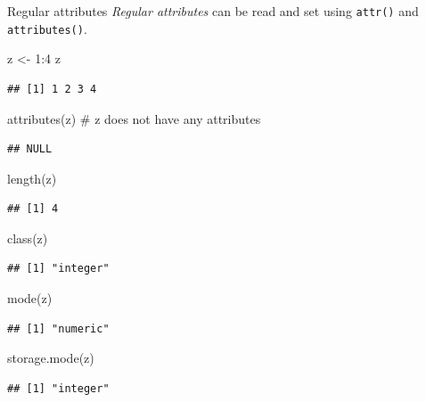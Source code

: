 \documentclass[
  9pt,
  ignorenonframetext,
]{beamer}
\newenvironment{Shaded}{\begin{snugshade}}{\end{snugshade}}
\newcommand{\CommentTok}[1]{\textcolor[rgb]{0.50,0.62,0.50}{#1}}
\newcommand{\DecValTok}[1]{\textcolor[rgb]{0.86,0.86,0.80}{#1}}
\newcommand{\KeywordTok}[1]{\textcolor[rgb]{0.94,0.87,0.69}{#1}}
\newcommand{\NormalTok}[1]{\textcolor[rgb]{0.80,0.80,0.80}{#1}}
\newcommand{\OperatorTok}[1]{\textcolor[rgb]{0.94,0.94,0.82}{#1}}
\newcommand{\StringTok}[1]{\textcolor[rgb]{0.80,0.58,0.58}{#1}}
\begin{document}
\begin{frame}[fragile]{Regular attributes}
\protect\hypertarget{regular-attributes}{}
\emph{Regular attributes} can be read and set using \texttt{attr()} and
\texttt{attributes()}.

\small
\vfill

\begin{Shaded}
\begin{Highlighting}[]
\NormalTok{z \textless{}{-}}\StringTok{ }\DecValTok{1}\OperatorTok{:}\DecValTok{4}
\NormalTok{z}
\end{Highlighting}
\end{Shaded}

\begin{verbatim}
## [1] 1 2 3 4
\end{verbatim}

\begin{Shaded}
\begin{Highlighting}[]
\KeywordTok{attributes}\NormalTok{(z)   }\CommentTok{\# z does not have any attributes}
\end{Highlighting}
\end{Shaded}

\begin{verbatim}
## NULL
\end{verbatim}

\begin{Shaded}
\begin{Highlighting}[]
\KeywordTok{length}\NormalTok{(z)}
\end{Highlighting}
\end{Shaded}

\begin{verbatim}
## [1] 4
\end{verbatim}

\begin{Shaded}
\begin{Highlighting}[]
\KeywordTok{class}\NormalTok{(z)  }
\end{Highlighting}
\end{Shaded}

\begin{verbatim}
## [1] "integer"
\end{verbatim}

\begin{Shaded}
\begin{Highlighting}[]
\KeywordTok{mode}\NormalTok{(z)}
\end{Highlighting}
\end{Shaded}

\begin{verbatim}
## [1] "numeric"
\end{verbatim}

\begin{Shaded}
\begin{Highlighting}[]
\KeywordTok{storage.mode}\NormalTok{(z)   }
\end{Highlighting}
\end{Shaded}

\begin{verbatim}
## [1] "integer"
\end{verbatim}
\end{frame}
\end{document}
